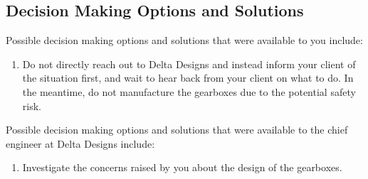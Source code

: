 \documentclass[12pt,letterpaper]{article}
\begin{document}
\subsection*{Decision Making Options and Solutions}
Possible decision making options and solutions that were available to you include:
\begin{enumerate}
	\item Do not directly reach out to Delta Designs and instead inform your client of the situation first, and wait to hear back from your client on what to do. In the meantime, do not manufacture the gearboxes due to the potential safety risk.
\end{enumerate}
Possible decision making options and solutions that were available to the chief engineer at Delta Designs include:
\begin{enumerate}
	\item Investigate the concerns raised by you about the design of the gearboxes.
\end{enumerate}
\clearpage




\end{document}
